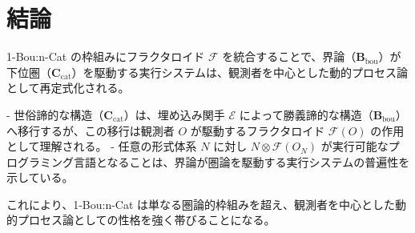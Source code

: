 \documentclass[11pt]{article}
\newcommand{\Cat}{\mathbf{C}_{\mathrm{cat}}}  %
\newcommand{\Bou}{\mathbf{B}_{\mathrm{bou}}}  %
\newcommand{\F}{\mathcal{F}}
\newcommand{\E}{\mathcal{E}}
\begin{document}
\section{結論}

1-Bou:n-Cat の枠組みにフラクタロイド $\F$ を統合することで、界論（$\Bou$）が下位圏（$\Cat$）を駆動する実行システムは、観測者を中心とした動的プロセス論として再定式化される。

- 世俗諦的な構造（$\Cat$）は、埋め込み関手 $\E$ によって勝義諦的な構造（$\Bou$）へ移行するが、この移行は観測者 $O$ が駆動するフラクタロイド $\F(O)$ の作用として理解される。
- 任意の形式体系 $N$ に対し $N \otimes \F(O_N)$ が実行可能なプログラミング言語となることは、界論が圏論を駆動する実行システムの普遍性を示している。

これにより、1-Bou:n-Cat は単なる圏論的枠組みを超え、観測者を中心とした動的プロセス論としての性格を強く帯びることになる。
\end{document}

